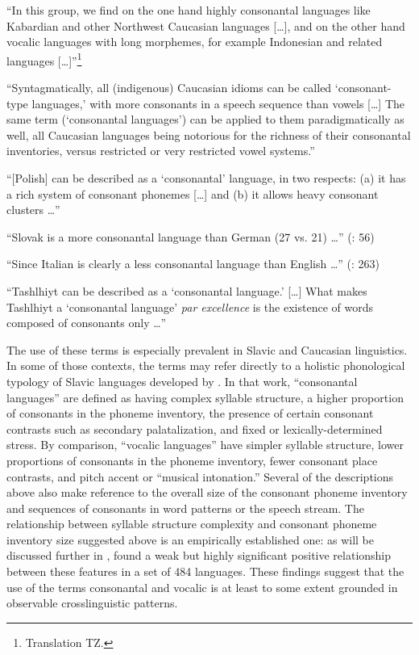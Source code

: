 \ea\label{ex:1.13}
   “In this group, we find on the one hand highly consonantal languages like Kabardian and other Northwest Caucasian languages […], and on the other hand vocalic languages with long morphemes, for example Indonesian and related languages […]”\footnote{{Translation TZ.}}
\citep[309]{Skalička1979}
\z

\ea\label{ex:1.14}
   “Syntagmatically, all (indigenous) Caucasian idioms can be called ‘consonant-type languages,’ with more consonants in a speech sequence than vowels […] The same term (‘consonantal languages’) can be applied to them paradigmatically as well, all Caucasian languages being notorious for the richness of their consonantal inventories, versus restricted or very restricted vowel systems.” 
\citep[43]{Chirikba2008}
\z

\ea\label{ex:1.15}
  “[Polish] can be described as a ‘consonantal’ language, in two respects: 
  (a) it has a rich system of consonant phonemes […] and (b) it allows heavy consonant clusters …” 
\citep[103]{Jassem2003}
\z

\ea\label{ex:1.16}
   “Slovak is a more consonantal language than German (27 vs. 21) …” 
(\citealt{DresslerEtAl2015}: 56)
\z

\ea\label{ex:1.17}
  “Since Italian is clearly a less consonantal language than English …” 
(\citealt{DresslerDziubalska-Kołaczyk2006}: 263)
\z

\ea\label{ex:1.18}
  “Tashlhiyt can be described as a ‘consonantal language.’ […] What makes Tashlhiyt a ‘consonantal language’ \textit{par excellence} is the existence of words composed of consonants only …” 
\citep[216]{Ridouane2014}
\z

The use of these terms is especially prevalent in Slavic and Caucasian linguistics. In some of those contexts, the terms may refer directly to a holistic phonological typology of Slavic languages developed by \citet{Isačenko1939/1940}. In that work, ``consonantal languages'' are defined as having complex syllable structure, a higher proportion of consonants in the phoneme inventory, the presence of certain consonant contrasts such as secondary palatalization, and fixed or lexically-determined stress. By comparison, ``vocalic languages'' have simpler syllable structure, lower proportions of consonants in the phoneme inventory, fewer consonant place contrasts, and pitch accent or ``musical intonation.'' Several of the descriptions above also make reference to the overall size of the consonant phoneme inventory and sequences of consonants in word patterns or the speech stream. The relationship between syllable structure complexity and consonant phoneme inventory size suggested above is an empirically established one: as will be discussed further in , \citet{Maddieson2013a} found a weak but highly significant positive relationship between these features in a set of 484 languages. These findings suggest that the use of the terms consonantal and vocalic is at least to some extent grounded in observable crosslinguistic patterns.

